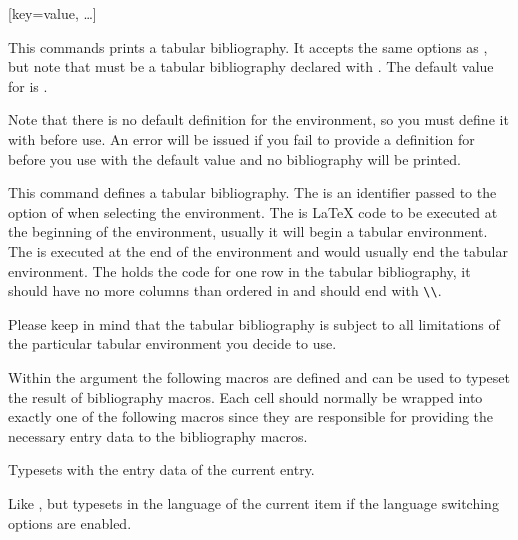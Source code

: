 \documentclass[11pt,a4paper]{article}
\def\latex{LaTeX}%
\begin{document}
\begin{ltxsyntax}
[key=value, \dots]

This commands prints a tabular bibliography.
It accepts the same options as , but note that
 must be a tabular bibliography declared with
.
The default value for  is .

\begin{warnbox}
Note that there is no default definition for the
 environment, so you must define it with
 before use.
An error will be issued if you fail to provide a definition
for  before you use  with the default
 value and no bibliography will be printed.
\end{warnbox}


This command defines a tabular bibliography.
The  is an identifier passed to the  option of
 when selecting the environment.
The  is \latex{} code to be executed at the beginning of the
environment, usually it will begin a tabular environment.
The  is executed at the end of the environment and would
usually end the tabular environment.
The  holds the code for one row in the tabular bibliography,
it should have no more columns than ordered in  and should
end with \lstinline|\\|.

\begin{remindbox}
Please keep in mind that the tabular bibliography is subject to all limitations
of the particular tabular environment you decide to use.
\end{remindbox}

Within the  argument the following macros are defined and can be
used to typeset the result of bibliography macros.
Each cell should normally be wrapped into exactly one of the following macros
since they are responsible for providing the necessary entry data to the
bibliography macros.


Typesets  with the entry data of the current entry.


Like , but typesets  in the language of the current
item if the language switching options are enabled.


\end{ltxsyntax}
\end{document}
